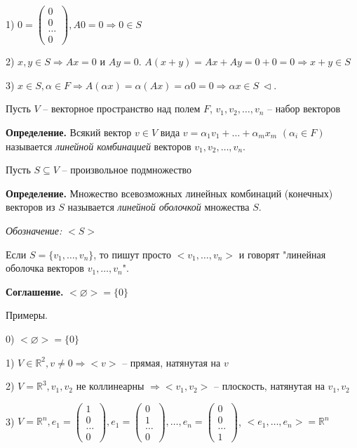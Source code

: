 1) $0 = \begin{pmatrix} 0 \\ 0 \\ \dots \\ 0 \end{pmatrix}, A0 = 0 \Rightarrow 0 \in S$

2) $x, y \in S \Rightarrow Ax = 0$ и $Ay = 0$. $A(x+y) = Ax + Ay = 0 + 0 = 0 \Rightarrow x + y \in S$

3) $x \in S, \alpha \in F \Rightarrow A(\alpha x) = \alpha (Ax) = \alpha 0 = 0 \Rightarrow \alpha x \in S \ \lhd$.

\vspace{\baselineskip}
Пусть $V$ -- векторное пространство над полем $F$, $v_1, v_2, \dots, v_n$ --  набор векторов

\vspace{\baselineskip}
\textbf{Определение.} Всякий вектор $v \in V$ вида $v = \alpha_1 v_1 + \dots + \alpha_m x_m$ $(\alpha_i \in F)$ называется \textit{линейной комбинацией} векторов $v_1, v_2, \dots, v_n$.

\vspace{\baselineskip}
Пусть $S \subseteq V$ -- произвольное подмножество

\vspace{\baselineskip}
\textbf{Определение.} Множество всевозможных линейных комбинаций (конечных) векторов из $S$ называется \textit{линейной оболочкой} множества $S$.

\textit{Обозначение:} $<S>$

\vspace{\baselineskip}
Если $S = \{v_1, \dots, v_n\}$, то пишут просто $<v_1, \dots, v_n>$ и говорят "линейная оболочка векторов $v_1, \dots, v_n$".

\vspace{\baselineskip}
\textbf{Соглашение.} $<\varnothing> = \{0\}$

\vspace{\baselineskip}
Примеры.

0) $<\varnothing> = \{0\}$

1) $V \in \mathbb{R}^2, v \neq 0 \Rightarrow <v>$ -- прямая, натянутая на $v$

2) $V = \mathbb{R}^3, v_1, v_2$ не коллинеарны $\Rightarrow <v_1, v_2>$ -- плоскость, натянутая на $v_1, v_2$

3) $V = \mathbb{R}^n, e_1 = \begin{pmatrix} 1 \\ 0 \\ \dots \\ 0 \end{pmatrix}, e_1 = \begin{pmatrix} 0 \\ 1 \\ \dots \\ 0 \end{pmatrix}, \dots, e_n = \begin{pmatrix} 0 \\ 0 \\ \dots \\ 1 \end{pmatrix}$, $<e_1, \dots, e_n> = \mathbb{R}^n$


